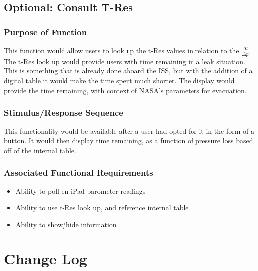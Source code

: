 \documentclass[onecolumn, draftclsnofoot,10pt, compsoc]{IEEEtran}
\begin{document}
\subsection{Optional: Consult T-Res}
\subsubsection{Purpose of Function}
This function would allow users to look up the t-Res values in relation to the $\frac{\Delta t}{\Delta p}$.
The t-Res look up would provide users with time remaining in a leak situation.
This is something that is already done aboard the ISS, but with the addition of a digital table it would make the time spent much shorter.
The display would provide the time remaining, with context of NASA's parameters for evacuation.
\subsubsection{Stimulus/Response Sequence}
This functionality would be available after a user had opted for it in the form of a button.
It would then display time remaining, as a function of pressure loss based off of the internal table.
\subsubsection{Associated Functional Requirements}
\begin{itemize}
\item Ability to poll on-iPad barometer readings
\item Ability to use t-Res look up, and reference internal table
\item Ability to show/hide information
\end{itemize}

\section{Change Log}
\end{document}
